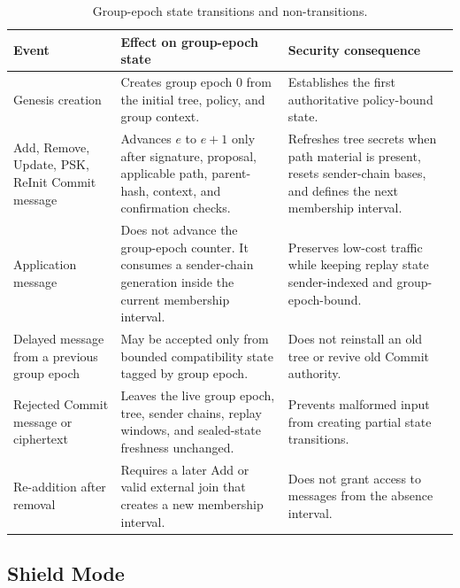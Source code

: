 \documentclass[preprint,12pt]{elsarticle}
\theoremstyle{definition}
\begin{document}
\begin{table}[tbp]
\centering
\caption{Group-epoch state transitions and non-transitions.}\label{tab:epoch-lifecycle}
\small
\begin{tabularx}{\textwidth}{@{}p{}YY@{}}
\toprule
Event & Effect on group-epoch state & Security consequence \\
\midrule
Genesis creation & Creates group epoch $0$ from the initial tree, policy, and group context. & Establishes the first authoritative policy-bound state. \\
Add, Remove, Update, PSK, ReInit Commit message & Advances $e$ to $e+1$ only after signature, proposal, applicable path, parent-hash, context, and confirmation checks. & Refreshes tree secrets when path material is present, resets sender-chain bases, and defines the next membership interval. \\
Application message & Does not advance the group-epoch counter. It consumes a sender-chain generation inside the current membership interval. & Preserves low-cost traffic while keeping replay state sender-indexed and group-epoch-bound. \\
Delayed message from a previous group epoch & May be accepted only from bounded compatibility state tagged by group epoch. & Does not reinstall an old tree or revive old Commit authority. \\
Rejected Commit message or ciphertext & Leaves the live group epoch, tree, sender chains, replay windows, and sealed-state freshness unchanged. & Prevents malformed input from creating partial state transitions. \\
Re-addition after removal & Requires a later Add or valid external join that creates a new membership interval. & Does not grant access to messages from the absence interval. \\
\bottomrule
\end{tabularx}
\end{table}

\subsection{Shield Mode}
\end{document}
